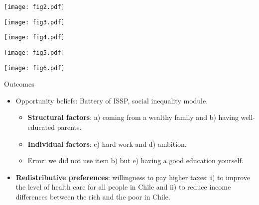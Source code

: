 \documentclass{beamer}
\begin{document}
\begin{frame}{} 
\begin{center}
	\texttt{[image: fig2.pdf]}
\end{center}
\end{frame}


\begin{frame}{} 
\begin{center}
	\texttt{[image: fig3.pdf]}
\end{center}
\end{frame}

\begin{frame}{} 
\begin{center}
	\texttt{[image: fig4.pdf]}
\end{center}
\end{frame}

\begin{frame}{} 
\begin{center}
	\texttt{[image: fig5.pdf]}
\end{center}
\end{frame}

\begin{frame}{} 
\begin{center}
	\texttt{[image: fig6.pdf]}
\end{center}
\end{frame}

\begin{frame}{Outcomes}

\begin{itemize}
\justifying
\item  Opportunity beliefs: Battery of ISSP, social inequality module.
\medskip
	\begin{itemize}
	\justifying
	\item \textbf{Structural factors}: a) coming from a wealthy family and b) having well-educated parents.
	\medskip
	\item \textbf{Individual factors}: c) hard work and d) ambition.
	\medskip
	\item  {\color{red} Error}: we did not use item b) but e) having a good education yourself.
	\end{itemize}
\medskip
\item \textbf{Redistributive preferences}: willingness to pay higher taxes: i) to improve the level of health care for all people in Chile and ii) to reduce income differences between the rich and the poor in Chile.
\end{itemize}

\end{frame}
\end{document}
